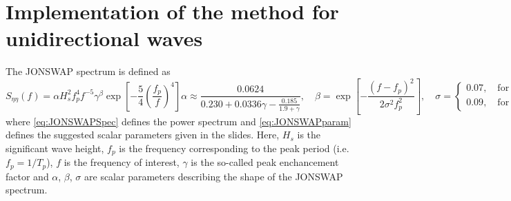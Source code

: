 \chapter{Implementation of the method for unidirectional waves}
The JONSWAP spectrum is defined as
\begin{subequations}
\begin{equation}
    S_{\eta \eta}(f) = \alpha H_s^2 f_p^4 f^{-5} \gamma^\beta \exp{\left[-\frac{5}{4}\left(\frac{f_p}{f}\right)^4\right]}
    \label{eq:JONSWAPSpec}
\end{equation} 
\begin{equation}
    \alpha \approx \frac{0.0624}{0.230+0.0336\gamma-\frac{0.185}{1.9+\gamma}} ,\quad \beta = \exp{\left[ -\frac{(f-f_p)^2}{2\sigma^2f_p^2} \right]}, \quad
    \sigma =
    \begin{cases}
    0.07, \quad \text{for }f\leq f_p \\
    0.09, \quad \text{for }f> f_p
    \end{cases}
    \label{eq:JONSWAPparam}
\end{equation}
\end{subequations}
where \cref{eq:JONSWAPSpec} defines the power spectrum and \cref{eq:JONSWAPparam} defines the suggested scalar parameters given in the slides. Here, $H_s$ is the significant wave height, $f_p$ is the frequency corresponding to the peak period (i.e. $f_p=1/T_p$), $f$ is the frequency of interest, $\gamma$ is the so-called peak enchancement factor and $\alpha$, $\beta$, $\sigma$ are scalar parameters describing the shape of the JONSWAP spectrum.

\begin{figure}[h!]
\begin{subfigure}[b]{.5\textwidth}
\centering
{}
\caption{ }
\label{fig:MassConvplot}
\end{subfigure}%
\end{figure}
